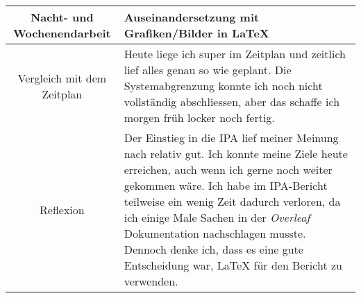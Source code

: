 \begin{tabularx}{\textwidth}[H]{|c|X|}
  Nacht- und Wochenendarbeit &
  Auseinandersetzung mit Grafiken/Bilder in LaTeX
  \\ \hline

  Vergleich mit dem Zeitplan &
  Heute liege ich super im Zeitplan und zeitlich lief alles genau so wie geplant.
  Die Systemabgrenzung konnte ich noch nicht vollständig abschliessen, aber das schaffe ich morgen früh locker noch fertig.
  \\ \hline

  Reflexion                  &
  Der Einstieg in die IPA lief meiner Meinung nach relativ gut. Ich konnte meine Ziele heute erreichen, auch wenn ich gerne
  noch weiter gekommen wäre. Ich habe im IPA-Bericht teilweise ein wenig Zeit dadurch verloren, da
  ich einige Male Sachen in der \emph{Overleaf} Dokumentation nachschlagen musste. Dennoch denke ich, dass es eine
  gute Entscheidung war, LaTeX für den Bericht zu verwenden.
  \\ \hline
\end{tabularx}
